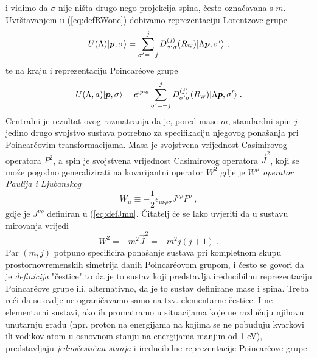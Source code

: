 i vidimo da $\sigma$ nije ništa drugo nego projekcija spina, često označavana s $m$.
Uvrštavanjem u (\ref{eq:defRWone}) dobivamo reprezentaciju Lorentzove
grupe
\begin{equation}
    U(\Lambda) \ket{\vec{p}, \sigma} = 
     \sum_{\sigma'=-j}^{j} D^{(j)}_{\sigma'\sigma}(R_{\scriptscriptstyle\rm W})
     \ket{\Lambda\vec{p}, \sigma'} \;,
\end{equation}
te na kraju i reprezentaciju Poincar\'{e}ove grupe
\begin{equation}
    U(\Lambda, a) \ket{\vec{p}, \sigma} =  e^{\rmi p \cdot a}
     \sum_{\sigma'=-j}^{j} D^{(j)}_{\sigma'\sigma}(R_{\scriptscriptstyle\rm W})
     \ket{\Lambda\vec{p}, \sigma'} \;.
\end{equation}
Centralni je rezultat ovog razmatranja da je, pored mase $m$, standardni spin $j$
jedino drugo svojstvo sustava potrebno za specifikaciju njegovog ponašanja
pri Poincar\'{e}ovim transformacijama.
Masa je svojstvena vrijednost Casimirovog operatora $P^2$, a spin
je svojstvena vrijednost Casimirovog operatora $\vec{J}^2$, koji se
može pogodno generalizirati na kovarijantni operator $W^2$ gdje je
$W^{\mu}$ \emph{operator Paulija i Ljubanskog}
\begin{equation}
    W_{\mu} \equiv - \frac{1}{2} \epsilon_{\mu \nu \rho \sigma}
    J^{\nu \rho} P^{\sigma} \,,
    \label{eq:defPLj}
\end{equation}
gdje je $J^{\nu \rho}$ definiran u (\ref{eq:defJmn}.
Čitatelj će se lako uvjeriti da u sustavu mirovanja vrijedi
\begin{equation}
    W^2 = - m^2 \vec{J}^2 = -m^2 j (j+1) \;.
\end{equation}
Par $(m, j)$ potpuno specificira ponašanje sustava pri kompletnom skupu
prostornovremenskih simetrija danih Poincar\'{e}ovom grupom, i često se
govori da je \emph{definicija} "čestice" to da je to sustav koji predstavlja
ireducibilnu reprezentaciju Poincar\'{e}ove grupe ili, alternativno,
da je to sustav definirane mase i spina.
Treba reći da se ovdje ne ograničavamo samo na tzv. elementarne čestice.
I ne-elementarni sustavi, ako ih promatramo u situacijama koje ne razlučuju
njihovu unutarnju građu (npr. proton na energijama na kojima se ne pobuđuju
kvarkovi ili vodikov atom u osnovnom stanju na energijama manjim od 1 eV),
predstavljaju \emph{jednočestična stanja} i ireducibilne reprezentacije
Poincar\'{e}ove grupe.

